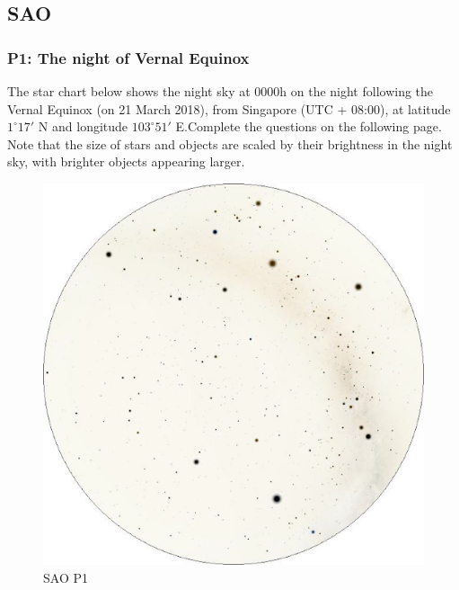 \documentclass[a4paper,12pt]{extarticle}
\begin{document}
\subsection{SAO}
\subsubsection{P1: The night of Vernal Equinox}
The star chart below shows the night sky at 0000h on the night following the Vernal Equinox (on 21 March 2018), from Singapore (UTC + 08:00), at latitude $1^\circ17'$ N and longitude $103^\circ51'$ E.Complete the questions on the following page. Note that the size of stars and objects are scaled by their brightness in the night sky, with brighter objects appearing larger.

\begin{figure}[H]
    \centering
    \includegraphics[width=0.9\linewidth]{SAO_1.png}
    \caption{SAO P1}
\end{figure}
\end{document}
